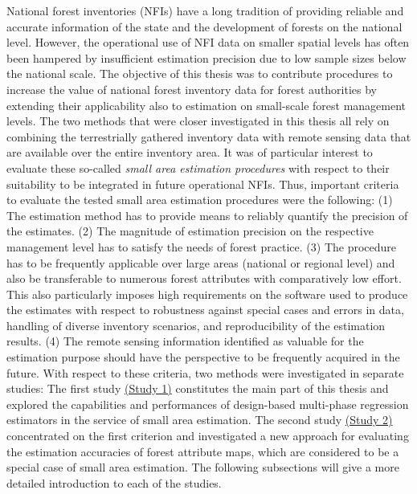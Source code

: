 National forest inventories (NFIs) have a long tradition of providing reliable and accurate information of the state and the development of forests on the national level. However, the operational use of NFI data on smaller spatial levels has often been hampered by insufficient estimation precision due to low sample sizes below the national scale. The objective of this thesis was to contribute procedures to increase the value of national forest inventory data for forest authorities by extending their applicability also to estimation on small-scale forest management levels. The two methods that were closer investigated in this thesis all rely on combining the terrestrially gathered inventory data with remote sensing data that are available over the entire inventory area. It was of particular interest to evaluate these so-called \textit{small area estimation procedures} with respect to their suitability to be integrated in future operational NFIs. Thus, important criteria to evaluate the tested small area estimation procedures were the following: (1) The estimation method has to provide means to reliably quantify the precision of the estimates. (2) The magnitude of estimation precision on the respective management level has to satisfy the needs of forest practice. (3) The procedure has to be frequently applicable over large areas (national or regional level) and also be transferable to numerous forest attributes with comparatively low effort. This also particularly imposes high requirements on the software used to produce the estimates with respect to robustness against special cases and errors in data, handling of diverse inventory scenarios, and reproducibility of the estimation results. (4) The remote sensing information identified as valuable for the estimation purpose should have the perspective to be frequently acquired in the future. With respect to these criteria, two methods were investigated in separate studies: The first study \hyperref[sec:study1]{(Study 1)} constitutes the main part of this thesis and explored the capabilities and performances of design-based multi-phase regression estimators in the service of small area estimation. The second study \hyperref[sec:study2]{(Study 2)} concentrated on the first criterion and investigated a new approach for evaluating the estimation accuracies of forest attribute maps, which are considered to be a special case of small area estimation. The following subsections will give a more detailed introduction to each of the studies.


